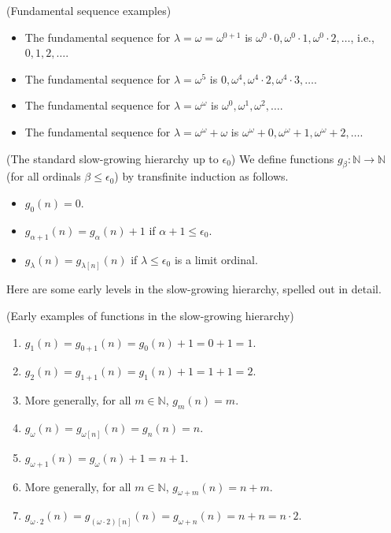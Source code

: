\documentclass[twoside,11pt]{article}
\begin{document}
\begin{example}
    (Fundamental sequence examples)
    \begin{itemize}
        \item
        The fundamental sequence for $\lambda=\omega=\omega^{0+1}$ is
        $\omega^0\cdot 0, \omega^0\cdot 1, \omega^0\cdot 2, \ldots$,
        i.e., $0, 1, 2, \ldots$.
        \item
        The fundamental sequence for $\lambda=\omega^5$ is
        $0,\omega^4,\omega^4\cdot 2,\omega^4\cdot 3,\ldots$.
        \item
        The fundamental sequence for $\lambda=\omega^\omega$ is
        $\omega^0,\omega^1,\omega^2,\ldots$.
        \item
        The fundamental sequence for $\lambda=\omega^\omega+\omega$ is
        $\omega^\omega+0,\omega^\omega+1,\omega^\omega+2,\ldots$.
    \end{itemize}
\end{example}

\begin{definition}
\label{slowgrowinghierarchydefn}
    (The standard slow-growing hierarchy up to $\epsilon_0$)
    We define functions $g_\beta:\mathbb N\to\mathbb N$ (for all ordinals
    $\beta\leq \epsilon_0$) by transfinite induction as follows.
    \begin{itemize}
        \item
        $g_0(n)=0$.
        \item
        $g_{\alpha+1}(n) = g_\alpha(n) + 1$ if $\alpha+1\leq\epsilon_0$.
        \item
        $g_{\lambda}(n) = g_{\lambda[n]}(n)$ if $\lambda\leq\epsilon_0$ is a limit ordinal.
    \end{itemize}
\end{definition}

Here are some early levels in the slow-growing hierarchy, spelled out in detail.

\begin{example}
\label{highdetailslowgrowingexample}
    (Early examples of functions in the slow-growing hierarchy)
    \begin{enumerate}
        \item
        $g_1(n)=g_{0+1}(n)=g_0(n)+1=0+1=1$.
        \item
        $g_2(n)=g_{1+1}(n)=g_1(n)+1=1+1=2$.
        \item
        More generally, for all $m\in\mathbb N$,
        $g_m(n)=m$.
        \item
        $g_\omega(n)=g_{\omega[n]}(n)=g_n(n)=n$.
        \item
        $g_{\omega+1}(n)=g_{\omega}(n)+1=n+1$.
        \item
        More generally, for all $m\in\mathbb N$,
        $g_{\omega+m}(n)=n+m$.
        \item
        $g_{\omega\cdot 2}(n)=g_{(\omega\cdot 2)[n]}(n)
        =g_{\omega+n}(n)=n+n=n\cdot 2$.
    \end{enumerate}
\end{example}
\end{document}
